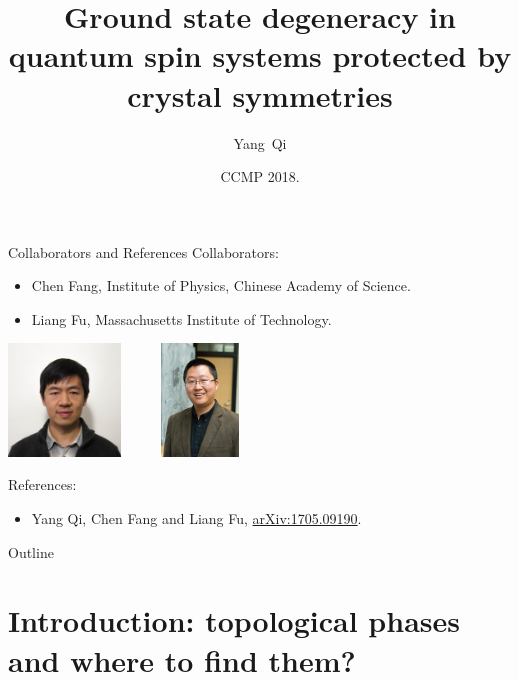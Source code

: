 \documentclass[xcolor=table, 10pt, aspectratio=43]{beamer}
\title[GSD Crystal] %
{Ground state degeneracy in quantum spin systems protected by crystal symmetries}
\author[Y Qi] %
{Yang~Qi}
\institute[Fudan] %
{
  Department of Physics, Fudan University
}
\date{CCMP 2018.}
\begin{document}
\begin{frame}
  \titlepage
\end{frame}

\begin{frame}{Collaborators and References}
  Collaborators:
  \begin{itemize}
		\item Chen Fang, Institute of Physics, Chinese Academy of Science.
		\item Liang Fu, Massachusetts Institute of Technology.
  \end{itemize}
  \begin{center}
    \includegraphics[height=3cm]{../people/chenfang}~~~~~
	  \includegraphics[height=3cm]{../people/liangfu}
  \end{center}
  References:
  {\small
  \begin{itemize}
  \item Yang Qi, Chen Fang and Liang Fu, \href{https://arxiv.org/abs/1705.09190}{arXiv:1705.09190}.
  \end{itemize}}
\end{frame}

\begin{frame}{Outline}
		\tableofcontents
\end{frame}

\section{Introduction: topological phases and where to find them?}
\end{document}
